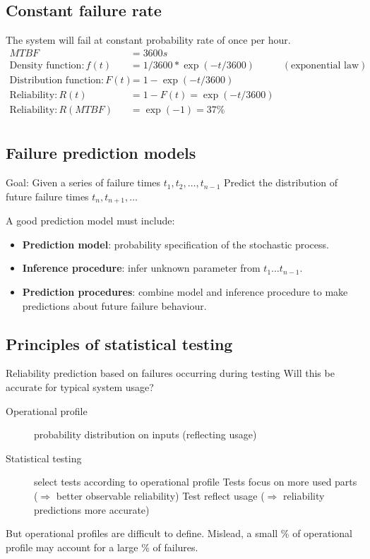 \subsection{Constant failure rate}
The system will fail at constant probability rate of once per hour. 
\begin{align*}
    MTBF &= 3600 s& \\
    \text{Density function}: f(t) &= 1/3600 * \exp( -t / 3600) &(\text{exponential law}) \\
    \text{Distribution function}: F(t) &= 1 - \exp(-t / 3600)& \\
    \text{Reliability}: R (t) &= 1 - F(t) = \exp(-t / 3600)& \\
    \text{Reliability}: R(MTBF) &= \exp(-1) = 37\%& \\
\end{align*}

\subsection{Failure prediction models}
Goal: Given a series of failure times ${t}_{1}, {t}_{2},\ldots, {t}_{n-1}$ \newline
Predict the distribution of future failure times ${t}_{n}, {t}_{n+1},\ldots$ \newline

A good prediction model must include:

\begin{itemize}
    \item \textbf{Prediction model}: probability specification of the stochastic process.
    \item \textbf{Inference procedure}: infer unknown parameter from ${t}_{1}\ldots{t}_{n-1}$.
    \item \textbf{Prediction procedures}: combine model and inference procedure to make predictions about future failure behaviour.
\end{itemize}

\subsection{Principles of statistical testing}

Reliability prediction based on failures occurring during testing \newline
Will this be accurate for typical system usage?

\begin{description}
    \item[Operational profile] probability distribution on inputs (reflecting usage)
    \item[Statistical testing] select tests according to operational profile
        \subitem{} Tests focus on more used parts ($\Rightarrow$ better observable reliability)
        \subitem{} Test reflect usage ($\Rightarrow$ reliability predictions more accurate)
\end{description}

But operational profiles are difficult to define.\newline
Mislead, a small \% of operational profile may account for a large \% of failures.
